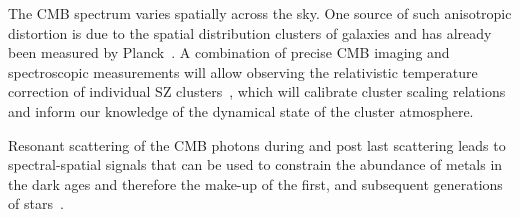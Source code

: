 The CMB spectrum varies spatially across the sky. One source of such anisotropic distortion is due to 
the spatial distribution clusters of galaxies and has already been measured by Planck~\cite{Planck2013SZ}. 
A combination of precise CMB imaging 
and spectroscopic measurements will allow observing the relativistic temperature correction of individual SZ 
clusters~\cite{Sazonov1998,Itoh98,Challinor98}, which will calibrate cluster scaling relations and inform our 
knowledge of the dynamical state of the cluster atmosphere. 

Resonant scattering of the CMB photons during and post last scattering leads to spectral-spatial signals
that can be used to constrain the abundance of metals in the dark ages and therefore the make-up of the 
first, and subsequent generations of stars~\cite{Jose2005, Carlos2007Pol, Lewis2013,Kaustuv2004, Schleicher2008}. 
